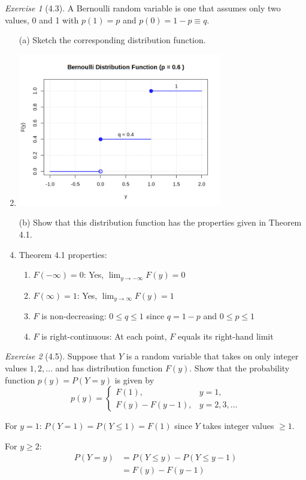 \documentclass[12pt]{amsart}
\makeatletter
\theoremstyle{remark}
\newtheorem*{exercise}{Exercise}%
\renewenvironment{proof}[1][\proofname]{\par\doublespacing
  \pushQED{\qed}%
  \normalfont \topsep6\p@\@plus6\p@\relax
  \list{}{%
    \settowidth{\leftmargin}{\itshape\proofname:\hskip\labelsep}%
    \setlength{\labelwidth}{0pt}%
    \setlength{\itemindent}{-\leftmargin}%
  }%
  \item[\hskip\labelsep\itshape#1\@addpunct{:}]\ignorespaces
}{%
  \popQED\endlist\@endpefalse
  \singlespacing
}
\theoremstyle{mycomment}
\makeatother
\begin{document}
\begin{exercise}[4.3]
A Bernoulli random variable is one that assumes only two values, 0 and 1 with $p(1) = p$ and $p(0) = 1 - p \equiv q$.

\begin{enumerate}
    \item[(a)] Sketch the corresponding distribution function.
\begin{proof}[Solution]
 	\includegraphics[width=0.7\textwidth]{exercise_4_3a.png}
\end{proof}
    \item[(b)] Show that this distribution function has the properties given in Theorem 4.1.
\begin{proof}[Solution]
 Theorem 4.1 properties:
	\begin{enumerate}
		\item $F(-\infty) = 0$: Yes, $\lim_{y \to -\infty} F(y) = 0$ 
		\item $F(\infty) = 1$: Yes, $\lim_{y \to \infty} F(y) = 1$ 
		\item $F$ is non-decreasing: $0 \leq q \leq 1$ since $q = 1-p$ and $0 \leq p \leq 1$ 
		\item $F$ is right-continuous: At each point, $F$ equals its right-hand limit 
	\end{enumerate}
\end{proof}
\end{enumerate} 
\end{exercise}

\begin{exercise}[4.5]
Suppose that $Y$ is a random variable that takes on only integer values $1, 2, \ldots$ and has distribution function $F(y)$. Show that the probability function $p(y) = P(Y = y)$ is given by
$$p(y) = \begin{cases}
F(1), & y = 1, \\
F(y) - F(y-1), & y = 2, 3, \ldots
\end{cases}$$

\begin{proof}[Solution]
 For $y = 1$: $P(Y = 1) = P(Y \leq 1) = F(1)$ since $Y$ takes integer values $\geq 1$.
	
	For $y \geq 2$:
	\begin{align*}
		P(Y = y) &= P(Y \leq y) - P(Y \leq y-1) \\
		&= F(y) - F(y-1)
  \end{align*}
\end{proof}
\end{exercise}
\end{document}
